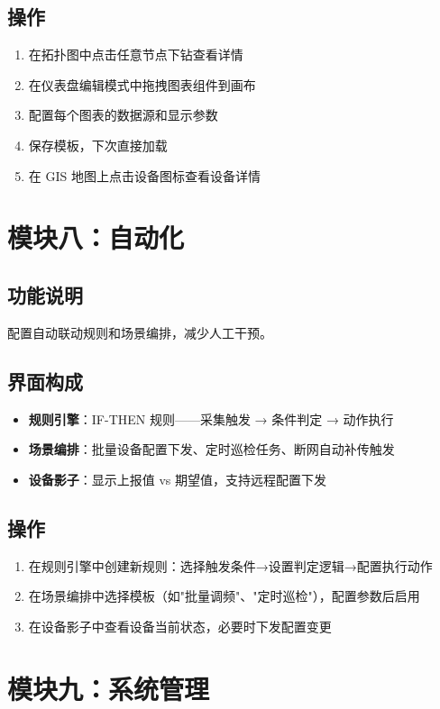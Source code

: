 \documentclass[11pt,a4paper]{ctexart}
\begin{document}
\subsection{操作}
\begin{enumerate}[leftmargin=*]
  \item 在拓扑图中点击任意节点下钻查看详情
  \item 在仪表盘编辑模式中拖拽图表组件到画布
  \item 配置每个图表的数据源和显示参数
  \item 保存模板，下次直接加载
  \item 在 GIS 地图上点击设备图标查看设备详情
\end{enumerate}

\section{模块八：自动化}

\subsection{功能说明}
配置自动联动规则和场景编排，减少人工干预。

\subsection{界面构成}
\begin{itemize}[leftmargin=*]
  \item \textbf{规则引擎}：IF-THEN 规则——采集触发 → 条件判定 → 动作执行
  \item \textbf{场景编排}：批量设备配置下发、定时巡检任务、断网自动补传触发
  \item \textbf{设备影子}：显示上报值 vs 期望值，支持远程配置下发
\end{itemize}

\subsection{操作}
\begin{enumerate}[leftmargin=*]
  \item 在规则引擎中创建新规则：选择触发条件→设置判定逻辑→配置执行动作
  \item 在场景编排中选择模板（如"批量调频"、"定时巡检"），配置参数后启用
  \item 在设备影子中查看设备当前状态，必要时下发配置变更
\end{enumerate}

\section{模块九：系统管理}
\end{document}
